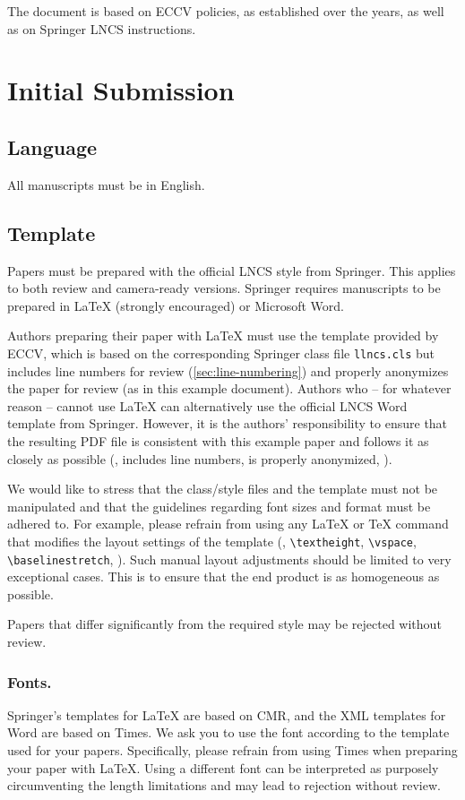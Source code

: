 \documentclass[runningheads]{llncs}
\begin{document}
The document is based on ECCV policies, as established over the years, as well as on Springer LNCS instructions.

\section{Initial Submission}

\subsection{Language}
All manuscripts must be in English.


\subsection{Template}
Papers must be prepared with the official LNCS style from Springer.
This applies to both review and camera-ready versions.
Springer requires manuscripts to be prepared in \LaTeX{} (strongly encouraged) or Microsoft Word. 

Authors preparing their paper with \LaTeX{} must use the template provided by ECCV, which is based on the corresponding Springer class file \texttt{llncs.cls} but includes line numbers for review (\cref{sec:line-numbering}) and properly anonymizes the paper for review (as in this example document).
Authors who -- for whatever reason -- cannot use \LaTeX{} can alternatively use the official LNCS Word template from Springer.
However, it is the authors' responsibility to ensure that the resulting PDF file is consistent with this example paper and follows it as closely as possible (\ie, includes line numbers, is properly anonymized, \etc).

We would like to stress that the class/style files and the template must not be manipulated and that the guidelines regarding font sizes and format must be adhered to. 
For example, please refrain from using any \LaTeX{} or \TeX{} command that modifies the layout settings of the template (\eg, \verb+\textheight+, \verb+\vspace+, \verb+\baselinestretch+, \etc).
Such manual layout adjustments should be limited to very exceptional cases.
This is to ensure that the end product is as homogeneous as possible.

Papers that differ significantly from the required style may be rejected without review.


\subsubsection{Fonts.}
Springer's templates for \LaTeX{} are based on CMR, and the XML templates for Word are based on Times. 
We ask you to use the font according to the template used for your papers. 
Specifically, please refrain from using Times when preparing your paper with \LaTeX{}.
Using a different font can be interpreted as purposely circumventing the length limitations and may lead to rejection without review.
\end{document}
